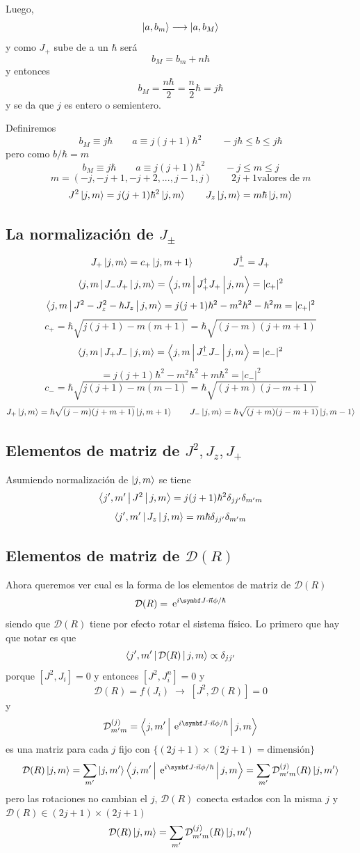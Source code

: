 \documentclass[10pt,oneside]{CBFT_book}
\begin{document}
Luego,
\[
	\Ket{a,b_m} \longrightarrow \Ket{a,b_M}
\]
y como $J_+$ sube de a un $\hbar$ será
\[
	b_M = b_m + n\hbar
\]
y entonces
\[
	b_M = \frac{n\hbar}{2} = \frac{n}{2} \hbar = j \hbar
\]
y se da que $j$ es entero o semientero.

Definiremos 
\[
	b_M \equiv j \hbar \qquad a \equiv j (j+1) \hbar^2 \qquad -j\hbar \leq b \leq j\hbar
\]
pero como $b/\hbar = m$
\[
	b_M \equiv j \hbar \qquad a \equiv j (j+1) \hbar^2 \qquad -j \leq m \leq j
\]
\[
	m = (-j,-j+1,-j+2,...,j-1,j) \qquad 2j+1 \text{valores de} \; m
\]
\[
	J^2 \Ket{j,m} = j( j+1 )\hbar^2\Ket{j,m} \qquad J_z \Ket{j,m} = m \hbar \Ket{j,m}
\]

\subsection{La normalización de $J_\pm$}

\[
	J_+\Ket{j,m} = c_+ \Ket{j,m+1} \qquad \qquad J_-^\dagger = J_+
\]
\[
	\Braket{j,m|J_-J_+|j,m} = \Braket{j,m|J_+^\dagger J_+|j,m} = |c_+|^2
\]
\[
	\Braket{j,m|J^2 - J_z^2 - \hbar J_z|j,m} = j(j+1)\hbar^2 - m^2\hbar^2 -\hbar^2 m = |c_+|^2
\]
\[
	c_+ = \hbar\sqrt{j(j+1)-m(m+1)} = \hbar \sqrt{(j-m)(j+m+1)}
\]
\[
	\Braket{j,m|J_+J_-|j,m} = \Braket{j,m|J_-^\dagger J_-|j,m} = |c_-|^2
\]
\[
	= j(j+1)\hbar^2 - m^2\hbar^2 + m\hbar^2 = |c_-|^2
\]
\[
	c_- = \hbar\sqrt{j(j+1)-m(m-1)} = \hbar \sqrt{(j+m)(j-m+1)}
\]
\[
	J_+ \Ket{j,m} = \hbar \sqrt{(j-m)(j+m+1)}\Ket{j,m+1} \qquad 
	J_- \Ket{j,m} = \hbar \sqrt{(j+m)(j-m+1)}\Ket{j,m-1}
\]

\subsection{Elementos de matriz de $J^2, J_z, J_+$}

Asumiendo normalización de $\Ket{j,m}$ se tiene 
\[
	\Braket{j',m'|J^2|j,m} = j(j+1)\hbar^2 \delta_{jj'} \delta_{m' m}
\]
\[
	\Braket{j',m'|J_z|j,m} = m \hbar \delta_{jj'} \delta_{m' m}
\]

\subsection{Elementos de matriz de $\mathcal{D}(R)$}

Ahora queremos ver cual es la forma de los elementos de matriz de $\mathcal{D}(R)$
\[
	\mathcal{D}(R) = \euler^{i \vb{J}\cdot\vec{n}\phi/\hbar}
\]
siendo que $\mathcal{D}(R)$ tiene por efecto rotar el sistema físico.
Lo primero que hay que notar es que 
\[
	\Braket{j',m'|\mathcal{D}(R)|j,m}  \propto \delta_{jj'}
\]
porque $[J^2,J_i]=0$ y entonces $[J^2,J_i^n]=0$ y 
\[
	\mathcal{D}(R) = f(J_i) \; \longrightarrow \; [ J^2, \mathcal{D}(R) ] = 0
\]
y 
\[
	\mathcal{D}^{(j)}_{m' m} =  \Braket{j,m'|\euler^{i \vb{J}\cdot\vec{n}\phi/\hbar}|j,m} 
\]
es una matriz para cada $j$ fijo con $\{ (2j+1)\times(2j+1)=\text{dimensión}\}$
\[
	\mathcal{D}(R)\Ket{j,m} = \sum_{m'} \ket{j,m'}\Braket{j,m'|\euler^{i \vb{J}\cdot\vec{n}\phi/\hbar}|j,m} 
	= \sum_{m'} \mathcal{D}^{(j)}_{m' m}(R) \Ket{j,m'} 
\]
pero las rotaciones no cambian el $j$, $\mathcal{D}(R)$ conecta estados con la misma $j$ y $\mathcal{D}(R) 
\in (2j+1)\times(2j+1)$ 
\[
	\mathcal{D}(R)\Ket{j,m} = \sum_{m'} \mathcal{D}^{(j)}_{m' m}(R) \Ket{j,m'} 
\]
\end{document}
